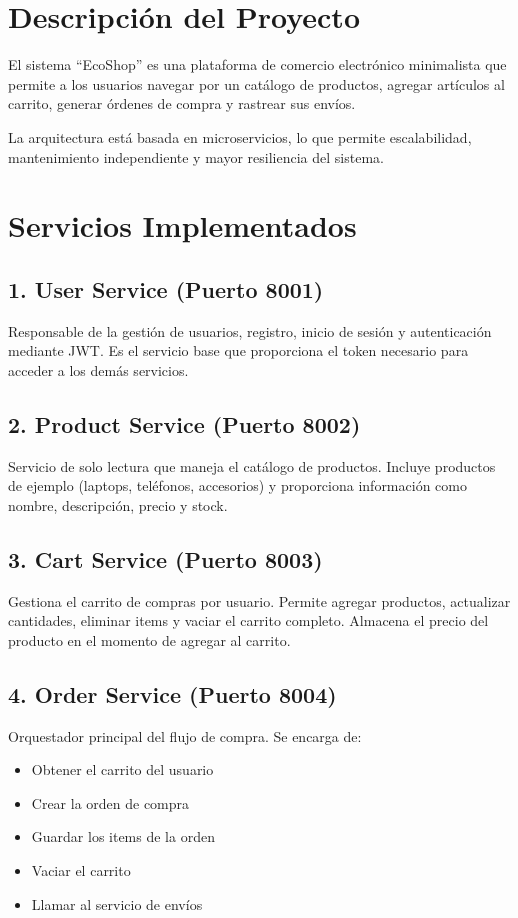 \documentclass[11pt,a4paper]{article}
\begin{document}
\section{Descripción del Proyecto}
El sistema ``EcoShop'' es una plataforma de comercio electrónico minimalista que permite a los usuarios navegar por un catálogo de productos, agregar artículos al carrito, generar órdenes de compra y rastrear sus envíos. 

La arquitectura está basada en microservicios, lo que permite escalabilidad, mantenimiento independiente y mayor resiliencia del sistema.

\section{Servicios Implementados}

\subsection{1. User Service (Puerto 8001)}
Responsable de la gestión de usuarios, registro, inicio de sesión y autenticación mediante JWT. Es el servicio base que proporciona el token necesario para acceder a los demás servicios.

\subsection{2. Product Service (Puerto 8002)}
Servicio de solo lectura que maneja el catálogo de productos. Incluye productos de ejemplo (laptops, teléfonos, accesorios) y proporciona información como nombre, descripción, precio y stock.

\subsection{3. Cart Service (Puerto 8003)}
Gestiona el carrito de compras por usuario. Permite agregar productos, actualizar cantidades, eliminar items y vaciar el carrito completo. Almacena el precio del producto en el momento de agregar al carrito.

\subsection{4. Order Service (Puerto 8004)}
Orquestador principal del flujo de compra. Se encarga de:
\begin{itemize}
    \item Obtener el carrito del usuario
    \item Crear la orden de compra
    \item Guardar los items de la orden
    \item Vaciar el carrito
    \item Llamar al servicio de envíos
\end{itemize}
\end{document}
